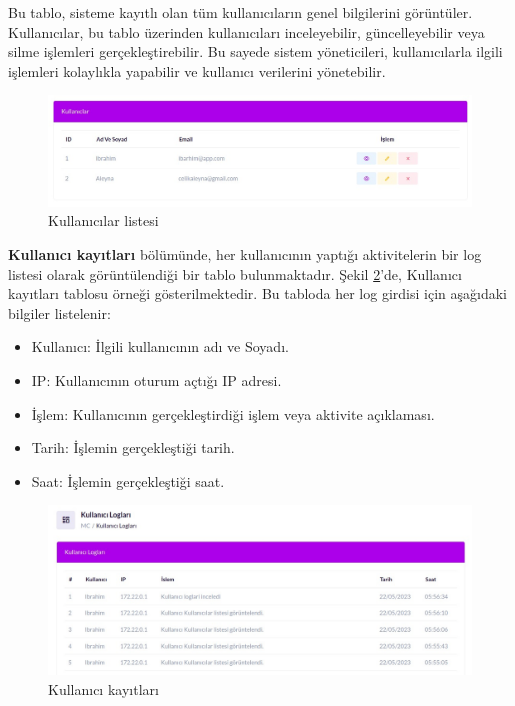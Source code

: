 Bu tablo, sisteme kayıtlı olan tüm kullanıcıların genel bilgilerini görüntüler. Kullanıcılar, bu tablo üzerinden kullanıcıları inceleyebilir, güncelleyebilir veya silme işlemleri gerçekleştirebilir. Bu sayede sistem yöneticileri, kullanıcılarla ilgili işlemleri kolaylıkla yapabilir ve kullanıcı verilerini yönetebilir.
\begin{figure}[ht]
	\centering
	\includegraphics[width=0.9\linewidth]{images/users.jpeg}
	\caption{Kullanıcılar listesi}
	\label{fig:users}
\end{figure}

\textbf{Kullanıcı kayıtları} bölümünde, her kullanıcının yaptığı aktivitelerin bir log listesi olarak görüntülendiği bir tablo bulunmaktadır. Şekil \ref{fig:log}'de, Kullanıcı kayıtları tablosu örneği gösterilmektedir.
Bu tabloda her log girdisi için aşağıdaki bilgiler listelenir:
\begin{itemize}
	\item Kullanıcı: İlgili kullanıcının adı ve Soyadı.
	\item IP: Kullanıcının oturum açtığı IP adresi.
	\item İşlem: Kullanıcının gerçekleştirdiği işlem veya aktivite açıklaması.
	\item Tarih: İşlemin gerçekleştiği tarih.
	\item Saat: İşlemin gerçekleştiği saat.
\end{itemize}

\begin{figure}[ht]
	\centering
	\includegraphics[width=0.9\linewidth]{images/log.jpeg}
	\caption{Kullanıcı kayıtları}
	\label{fig:log}
\end{figure}

